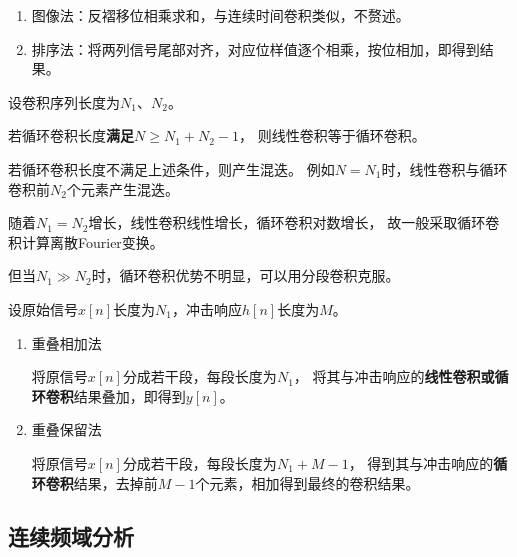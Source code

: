 \documentclass[UTF8,fontset=fandol,zihao=5]{ctexart}
\begin{document}
\begin{enumerate}
\begin{methodbox}[【技巧】线性卷积计算]
\begin{enumerate}[label=\arabic*.]
      \item 图像法：反褶移位相乘求和，与连续时间卷积类似，不赘述。

      \item 排序法：将两列信号尾部对齐，对应位样值逐个相乘，按位相加，即得到结果。
    \end{enumerate}
  \end{methodbox}
  
  \begin{methodbox}[【技巧】循环卷积计算]

  \end{methodbox}

  \begin{methodbox}[【技巧】利用线性卷积求解循环卷积]
  设卷积序列长度为$N_1$、$N_2$。

  若循环卷积长度\textbf{满足$N \geq N_1 + N_2 - 1$}，
  则线性卷积等于循环卷积。

  若循环卷积长度不满足上述条件，则产生混迭。
  例如$N=N_1$时，线性卷积与循环卷积前$N_2$个元素产生混迭。

  随着$N_1=N_2$增长，线性卷积线性增长，循环卷积对数增长，
    故一般采取循环卷积计算离散Fourier变换。

    但当$N_1 \gg N_2$时，循环卷积优势不明显，可以用分段卷积克服。
  \end{methodbox}
  
  \begin{methodbox}[【技巧】分段卷积]

  设原始信号$x[n]$长度为$N_1$，冲击响应$h[n]$长度为$M$。

    \begin{enumerate}[label=\arabic*.]
      \item 重叠相加法

      将原信号$x[n]$分成若干段，每段长度为$N_1$，
      将其与冲击响应的\textbf{线性卷积或循环卷积}结果叠加，即得到$y[n]$。
      
      \item 重叠保留法
      
      将原信号$x[n]$分成若干段，每段长度为$N_1 + M - 1$，
      得到其与冲击响应的\textbf{循环卷积}结果，去掉前$M - 1$个元素，相加得到最终的卷积结果。
    \end{enumerate}

  \end{methodbox}

\end{enumerate}

\subsection{连续频域分析}
\end{document}
